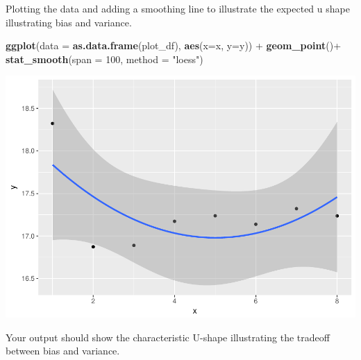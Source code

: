 \documentclass[]{article}
\newenvironment{Shaded}{\begin{snugshade}}{\end{snugshade}}
\newcommand{\KeywordTok}[1]{\textcolor[rgb]{0.13,0.29,0.53}{\textbf{{#1}}}}
\newcommand{\DataTypeTok}[1]{\textcolor[rgb]{0.13,0.29,0.53}{{#1}}}
\newcommand{\DecValTok}[1]{\textcolor[rgb]{0.00,0.00,0.81}{{#1}}}
\newcommand{\StringTok}[1]{\textcolor[rgb]{0.31,0.60,0.02}{{#1}}}
\newcommand{\NormalTok}[1]{{#1}}
\begin{document}
Plotting the data and adding a smoothing line to illustrate the expected
u shape illustrating bias and variance.

\begin{Shaded}
\begin{Highlighting}[]
\KeywordTok{ggplot}\NormalTok{(}\DataTypeTok{data =} \KeywordTok{as.data.frame}\NormalTok{(plot_df), }\KeywordTok{aes}\NormalTok{(}\DataTypeTok{x=}\NormalTok{x, }\DataTypeTok{y=}\NormalTok{y)) +}\StringTok{ }
\StringTok{  }\KeywordTok{geom_point}\NormalTok{()+}
\StringTok{  }\KeywordTok{stat_smooth}\NormalTok{(}\DataTypeTok{span =} \DecValTok{100}\NormalTok{, }\DataTypeTok{method =} \StringTok{"loess"}\NormalTok{)}
\end{Highlighting}
\end{Shaded}

\includegraphics{CHunt_Assign12_files/figure-latex/unnamed-chunk-4-1.pdf}

Your output should show the characteristic U-shape illustrating the
tradeoff between bias and variance.
\end{document}
